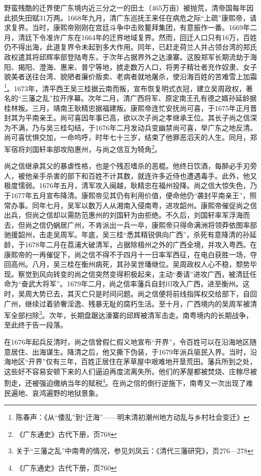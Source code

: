 野蛮残酷的迁界使广东境内近三分之一的田土（465万亩）被抛荒，清帝国每年因此损失田赋31万两。1668年九月，清广东巡抚王来任在病危之际“上疏”康熙帝，请求复界。当时，康熙帝刚刚在宫廷斗争中击败鳌拜集团，有意振作一番。1669年二月，清廷下令准许广东在1664年的迁界地域复界。然而，回迁人口只有16万，百姓仍不得出海，此道复界令未起到多大作用。同年，已赶走荷兰人并占领台湾的郑氏政权遣其将邱辉率部登陆粤东，于次年占据界外之达濠寨。这股郑军长期流劫于海阳、揭阳、澄海、惠来、普宁等地，掳走数万人口，将男子精壮者充作奴隶、女子貌美者送往台湾、貌陋者廉价贩卖、老病者就地屠杀，使沿海百姓的苦难雪上加霜\footnote{陈春声：《从“倭乱”到“迁海”——明末清初潮州地方动乱与乡村社会变迁》}。1673年，清平西王吴三桂据云南而叛，宣布恢复明式衣冠，建立吴周政权，著名的“三藩之乱”拉开序幕。次年二月，清广西将军、原定南王孔有德之婿孙延龄据桂林叛。三月，靖南王耿精忠据福建叛。康熙帝连忙安抚尚可喜，于1675年正月晋封其为平南亲王。尚可喜因年事已高，欲以次子尚之孝继承王位。其长子尚之信深为不满，乃与吴三桂勾结，于1676年二月发动兵变幽禁尚可喜，举广东之地反清。尚可喜忧惧交加，一命呜呼，时年七十三岁，结束了他罪恶滔天的人生。同月，郑军宿将刘国轩率部攻陷惠州，与尚之信互为犄角\footnote{《广东通史》古代下册，页768}。

尚之信继承其父的暴虐性格，也是个残忍嗜杀的恶棍。他终日饮酒，每醉必手刃旁人，被他亲手杀害的部下和百姓不计其数，就连许多近侍也遭遇毒手。此外，他又极度懦弱。1676年五月，清军攻入闽越，耿精忠在福州投降。尚之信大惊失色，乃于1677年五月宣布降清。康熙帝见其仍有利用价值，便命他仍“袭封平南亲王”，照常办事。同年七月，吴军以数万人从湘南入侵南粤，进攻韶州。康熙帝催促尚之信出兵，但尚之信却以需防范惠州的刘国轩为由拒绝。不久后，刘国轩率军浮海而去，但尚之信仍蜗居广州，不肯派出一兵一卒，康熙帝只得命满洲将领莽依图率部驰援韶州，击走吴周军。年底，吴三桂“悉其精锐俱向广西”，杀死有意降清的孙延龄，于1678年二月在荔浦大破清军，占据除梧州之外的广西全境，并攻入粤西。在康熙帝的一再催促下，尚之信不得不于四月十一日率军西征，在电白获胜一场，夺回高州。八月，吴三桂在衡州病死，其孙吴世璠继位。吴周政权人心不稳，颓势毕现。察觉到风向转变的尚之信突然变得积极起来，主动“奏请”进攻广西，被清廷任命为“奋武大将军”。1679年二月，尚之信率藩兵自封川攻入广西，进至衡州。这时，吴周大势已去，其灭亡只是时间问题。尚之信便将前线指挥权交给部下，自回广州，继续过着骄奢淫逸、残暴无耻的腐朽生活。至十月，广西境内的吴周军被清军全部扫除\footnote{关于“三藩之乱”中南粤的情况，参见刘凤云：《清代三藩研究》，页276—278}。次年，长期盘踞达濠寨的邱辉被清军击走。南粤境内的长期战争，至此终于告一段落。

在1676年起兵反清时，尚之信曾假仁假义地宣布“开界”，令百姓可以在沿海地区随意居住、出海谋生。降清之后，他又撕下伪装，于1679年派兵驱民入界。当时，沿海地区“开界”仅有三年，百姓正居住在茅草屋中艰难地开垦荒田。藩兵所到之处，这些好不容易安顿下来的人们逼迫再度流离失所。他们的茅屋都被焚烧、庄稼尽被割走，还被强迫缴纳当年的赋税\footnote{《广东通史》古代下册，页760}。在尚之信的倒行逆施下，南粤又一次出现了难民遍地、哀鸿遍野的地狱景象。


